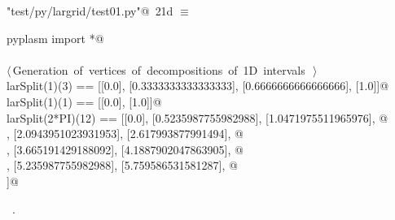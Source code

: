 \documentclass[11pt,oneside]{article}	%
\begin{document}
\begin{flushleft} \small \label{scrap35}
\protect{}\verb@"test/py/largrid/test01.py"@\nobreak\ {\footnotesize 21d }$\equiv$
\vspace{-1ex}
\begin{list}{}{} \item
\mbox{}\verb@from pyplasm import *@\\
\mbox{}\verb@@\\
\mbox{}\verb@@\hbox{$\langle\,$Generation of vertices of decompositions of 1D intervals\nobreak\ {\footnotesize {}}$\,\rangle$}\verb@@\\
\mbox{}\verb@assert larSplit(1)(3) == [[0.0], [0.3333333333333333], [0.6666666666666666], [1.0]]@\\
\mbox{}\verb@assert larSplit(1)(1) == [[0.0], [1.0]]@\\
\mbox{}\verb@assert larSplit(2*PI)(12) == [[0.0], [0.5235987755982988], [1.0471975511965976], @\\
\mbox{}\verb@[1.5707963267948966], [2.0943951023931953], [2.617993877991494], @\\
\mbox{}\verb@[3.141592653589793], [3.665191429188092], [4.1887902047863905], @\\
\mbox{}\verb@[4.71238898038469], [5.235987755982988], [5.759586531581287], @\\
\mbox{}\verb@[6.283185307179586]]@\\
\mbox{}\verb@@{\NWsep}
\end{list}
\vspace{-1ex}
\footnotesize\addtolength{\baselineskip}{-1ex}
\begin{list}{}{\setlength{\itemsep}{-\parsep}\setlength{\itemindent}{-\leftmargin}}
\item \NWtxtFileDefBy\ .
\end{list}
\end{flushleft}
\end{document}
